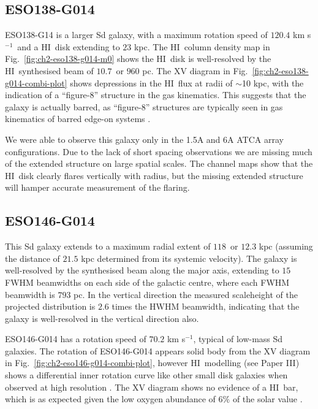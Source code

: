 \documentclass[traditabstract]{aa} %
\newcommand\HI{H{\small I}}
\newcommand\kms{km s$^{-1}$}
\begin{document}
\subsection{ESO138-G014}

ESO138-G14 is a larger Sd galaxy, with a maximum rotation speed of
$120.4$ \kms\ and a \HI\ disk extending to $23$ kpc. The \HI\ column
density map in Fig.~\ref{fig:ch2-eso138-g014-m0} shows the \HI\ disk
is well-resolved by the \HI\ synthesised beam of $10.7$\arcsec\ or
$960$ pc. The XV diagram in
Fig.~\ref{fig:ch2-eso138-g014-combi-plot} shows depressions in the
\HI\ flux at radii of $\sim$10 kpc, with the indication of a
``figure-8'' structure in the gas kinematics. This suggests that the
galaxy is actually barred, as ``figure-8'' structures are typically
seen in gas kinematics of barred edge-on systems \citep{bf1999}.

We were able to observe this galaxy only in the 1.5A and
6A ATCA array configurations. Due to the lack of short spacing
observations we are missing much of the extended structure on large
spatial scales. The channel maps show that the \HI\ disk clearly
flares vertically with radius, but the missing extended structure 
will hamper accurate measurement of the flaring.



\subsection{ESO146-G014} %

This Sd galaxy extends to a maximum radial extent of $118$\arcsec\
or $12.3$ kpc (assuming the distance of $21.5$ kpc determined from
its systemic velocity). The galaxy is well-resolved by the synthesised
beam along the major axis, extending to $15$ FWHM beamwidths on
each side of the galactic centre, where each FWHM beamwidth is $793$
pc. In the vertical direction the measured scaleheight of the
projected distribution is $2.6$ times the HWHM beamwidth, indicating
that the galaxy is well-resolved in the vertical direction also.

ESO146-G014 has a rotation speed of $70.2$ \kms, typical of low-mass
Sd galaxies. The rotation of ESO146-G014 appears solid body from
the XV diagram in Fig.~\ref{fig:ch2-eso146-g014-combi-plot},
however \HI\ modelling (see Paper III) shows a differential inner rotation
curve like other small disk galaxies when observed at high resolution
\citep[e.g.][]{swaters1999}. The XV diagram shows no evidence of a
\HI\ bar, which is as expected given the low oxygen abundance of
$6\%$ of the solar value \citep{br1995}.
\end{document}
